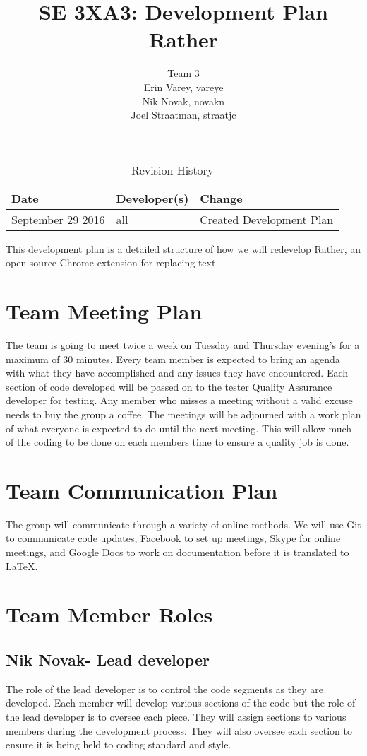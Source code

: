 \documentclass{article}
\title{SE 3XA3: Development Plan\\Rather}
\author{Team 3
		\\ Erin Varey, vareye
		\\ Nik Novak, novakn
		\\ Joel Straatman, straatjc
}
\date{}
\begin{document}
\begin{table}[hp]
\caption{Revision History} \label{TblRevisionHistory}
\begin{tabularx}{\textwidth}{llX}
\toprule
\textbf{Date} & \textbf{Developer(s)} & \textbf{Change}\\
\midrule
September 29 2016 & all & Created Development Plan\\

\bottomrule
\end{tabularx}
\end{table}
\newpage
\maketitle
This development plan is a detailed structure of how we will redevelop Rather, an open source Chrome extension for replacing text.
\section{Team Meeting Plan}
The team is going to meet twice a week on Tuesday and Thursday evening's for a maximum of 30 minutes. Every team member is expected to bring an agenda with what they have accomplished and any issues they have encountered. Each section of code developed will be passed on to the tester Quality Assurance developer for testing. Any member who misses a meeting without a valid excuse needs to buy the group a coffee. The meetings will be adjourned with a work plan of what everyone is expected to do until the next meeting. This will allow much of the coding to be done on each members time to ensure a quality job is done. 
\section{Team Communication Plan}
The group will communicate through a variety of online methods. We will use Git to communicate code updates, Facebook to set up meetings, Skype for online meetings, and Google Docs to work on documentation before it is translated to LaTeX.
\section{Team Member Roles}
\subsection{Nik Novak- Lead developer}
The role of the lead developer is to control the code segments as they are developed. Each member will develop various sections of the code but the role of the lead developer is to oversee each piece. They will assign sections to various members during the development process. They will also oversee each section to ensure it is being held to coding standard and style. 
\end{document}
